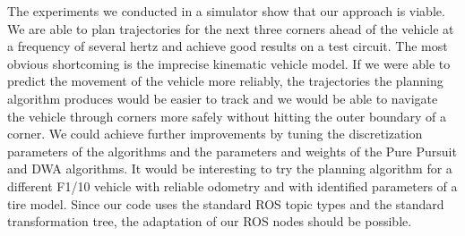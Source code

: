 The experiments we conducted in a simulator show that our approach is viable. We are able to plan trajectories for the next three corners ahead of the vehicle at a frequency of several hertz and achieve good results on a test circuit. The most obvious shortcoming is the imprecise kinematic vehicle model. If we were able to predict the movement of the vehicle more reliably, the trajectories the planning algorithm produces would be easier to track and we would be able to navigate the vehicle through corners more safely without hitting the outer boundary of a corner. We could achieve further improvements by tuning the discretization parameters of the algorithms and the parameters and weights of the Pure Pursuit and DWA algorithms. It would be interesting to try the planning algorithm for a different F1/10 vehicle with reliable odometry and with identified parameters of a tire model. Since our code uses the standard \gls*{ROS} topic types and the standard transformation tree, the adaptation of our \gls*{ROS} nodes should be possible.